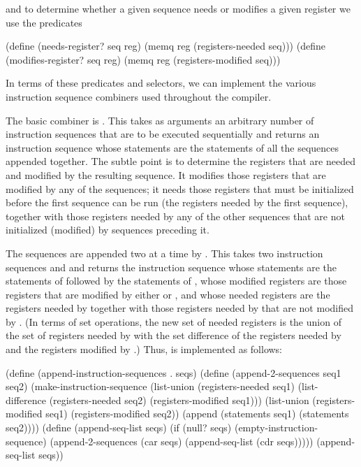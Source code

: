 \noindent
and to determine whether a given
sequence needs or modifies a given register we use the predicates

\begin{codeBlock}
(define (needs-register? seq reg)
  (memq reg (registers-needed seq)))
(define (modifies-register? seq reg)
  (memq reg (registers-modified seq)))
\end{codeBlock}

\noindent
In terms of these predicates and selectors, we can implement the various
instruction sequence combiners used throughout the compiler.

The basic combiner is .  This takes as
arguments an arbitrary number of instruction sequences that are to be executed
sequentially and returns an instruction sequence whose statements are the
statements of all the sequences appended together.  The subtle point is to
determine the registers that are needed and modified by the resulting sequence.
It modifies those registers that are modified by any of the sequences; it needs
those registers that must be initialized before the first sequence can be run
(the registers needed by the first sequence), together with those registers
needed by any of the other sequences that are not initialized (modified) by
sequences preceding it.

The sequences are appended two at a time by .  This
takes two instruction sequences  and  and returns the
instruction sequence whose statements are the statements of 
followed by the statements of , whose modified registers are those
registers that are modified by either  or , and whose
needed registers are the registers needed by  together with those
registers needed by  that are not modified by .  (In
terms of set operations, the new set of needed registers is the union of the
set of registers needed by  with the set difference of the registers
needed by  and the registers modified by .)  Thus,
 is implemented as follows:

\begin{codeBlock}
(define (append-instruction-sequences . seqs)
  (define (append-2-sequences seq1 seq2)
    (make-instruction-sequence
     (list-union
      (registers-needed seq1)
      (list-difference (registers-needed seq2)
                       (registers-modified seq1)))
     (list-union (registers-modified seq1)
                 (registers-modified seq2))
     (append (statements seq1) (statements seq2))))
  (define (append-seq-list seqs)
    (if (null? seqs)
        (empty-instruction-sequence)
        (append-2-sequences
         (car seqs)
         (append-seq-list (cdr seqs)))))
  (append-seq-list seqs))
\end{codeBlock}

